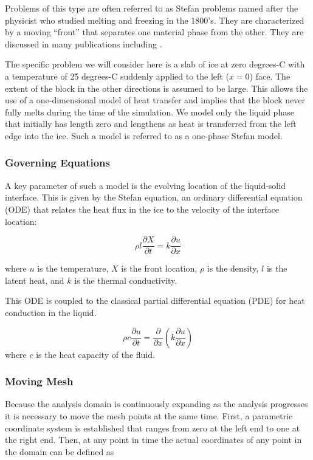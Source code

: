 \documentclass{article}
\begin{document}
Problems of this type are often referred to as Stefan problems named after the physicist
who studied melting and freezing in the 1800's. They are characterized by a moving ``front''
that separates one material phase from the other. They are discussed in many publications
including \cite{meltingFreezing}.

The specific problem we will consider here is a slab of ice at zero degrees-C
with a temperature of 25 degrees-C suddenly applied to the left ($x=0$) face. The
extent of the block in the other directions is assumed to be large. This allows the
use of a one-dimensional model of heat transfer and implies that the block never fully
melts during the time of the simulation. We model only the liquid phase that initially 
has length zero and lengthens as heat is transferred from the left edge into the ice. Such 
a model is referred to as a one-phase Stefan model.

\subsubsection{Governing Equations}
A key parameter of such a model is the evolving location of the liquid-solid interface. 
This is given by the Stefan equation, an ordinary differential equation (ODE) that relates the
heat flux in the ice to the velocity of the interface location:

\begin{equation}\label{eq:stefan}
	\rho l \frac{\partial X}{\partial t}=k\frac{\partial u}{\partial x}
\end{equation}

where $u$ is the temperature, $X$ is the front location, $\rho$ is the density,
$l$ is the latent heat, and $k$ is the thermal conductivity. 

This ODE is coupled to the classical partial differential equation (PDE) for heat
conduction in the liquid.

\begin{equation}\label{eq:head_cond_liquid}
	\rho c \frac{\partial u}{\partial t} = 
	\frac{\partial}{\partial x}\left(k \frac{\partial u}{\partial x}\right)
\end{equation}
where $c$ is the heat capacity of the fluid.

\subsubsection{Moving Mesh}
Because the analysis domain is continuously expanding as the analysis progresses it is
necessary to move the mesh points at the same time. First, a parametric coordinate
system is established that ranges from zero at the left end to one at the right end.
Then, at any point in time the actual coordinates of any point in the domain can be
defined as
\end{document}
